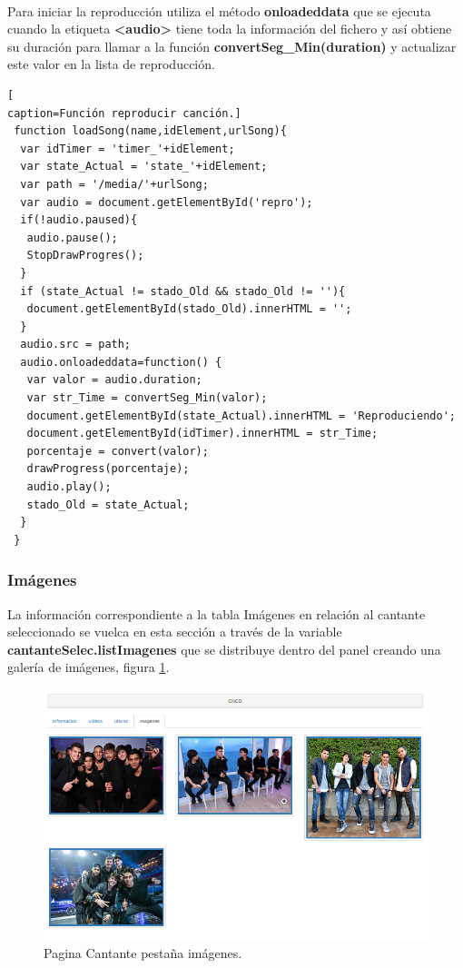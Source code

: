 \\Para iniciar la reproducción utiliza el método \textbf{onloadeddata} que se ejecuta cuando la etiqueta \textbf{<audio>} tiene toda la información del fichero y así obtiene su duración para llamar a la función\textbf{ convertSeg\_Min(duration)} y actualizar este valor en la lista de reproducción.
\begin{lstlisting}[
caption=Función reproducir canción.]
 function loadSong(name,idElement,urlSong){
  var idTimer = 'timer_'+idElement;
  var state_Actual = 'state_'+idElement;
  var path = '/media/'+urlSong;
  var audio = document.getElementById('repro');
  if(!audio.paused){
   audio.pause();
   StopDrawProgres();
  }
  if (state_Actual != stado_Old && stado_Old != ''){
   document.getElementById(stado_Old).innerHTML = '';
  }
  audio.src = path;	
  audio.onloadeddata=function() {
   var valor = audio.duration;
   var str_Time = convertSeg_Min(valor);
   document.getElementById(state_Actual).innerHTML = 'Reproduciendo';
   document.getElementById(idTimer).innerHTML = str_Time;
   porcentaje = convert(valor);
   drawProgress(porcentaje);
   audio.play();
   stado_Old = state_Actual;
  }
 }
\end{lstlisting}
\subsubsection*{Imágenes}
La información correspondiente a la tabla Imágenes en relación al cantante seleccionado se vuelca en esta sección a través de la variable \textbf{cantanteSelec.listImagenes} que se distribuye dentro del panel creando una galería de imágenes, figura \ref{fig:Imagenes_Cantante}.
\begin{figure}[!h]
\begin{center}
   \includegraphics[width=0.6\linewidth]{Figures/imagenes_Cantante}
	\decoRule
	\caption[Cantante pestaña imágenes]{Pagina Cantante pestaña imágenes.}
\label{fig:Imagenes_Cantante}
\end{center}
\end{figure}
